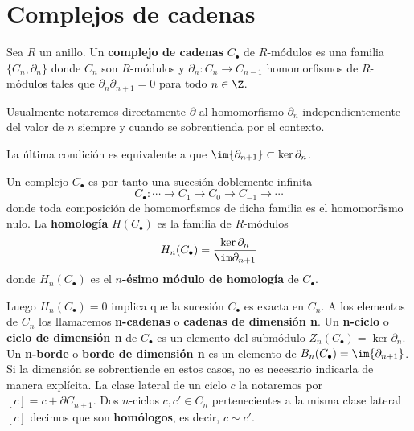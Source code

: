 \section{Complejos de cadenas}

\begin{definicion}
	Sea \(R\) un anillo. Un \textbf{complejo de cadenas} \(C_{\bullet}\) de \(R\)-módulos
	es una familia \(\{C_{n}, \partial_{n}\}\) donde \(C_{n}\) son \(R\)-módulos y \(\partial
	_{n} : C_{n} \rightarrow C_{n-1}\) homomorfismos de \(R\)-módulos tales que \(\partial
	_{n} \partial_{n+1}= 0\) para todo \(n \in \Z\).
\end{definicion}
\begin{nota}
	Usualmente notaremos directamente \(\partial\) al homomorfismo \(\partial_{n}\) independientemente
	del valor de \(n\) siempre y cuando se sobrentienda por el contexto.
\end{nota}
\begin{observacion}
	La última condición es equivalente a que \(\im{\partial_{n+1}}\subset \ker{\partial_n}\).
\end{observacion}
Un complejo \(C_{\bullet}\) es por tanto una sucesión doblemente infinita
\[
C_{\bullet}: \cdots \rightarrow C_{1}\rightarrow C_{0} \rightarrow C_{-1}\rightarrow
\cdots
\]
donde toda composición de homomorfismos de dicha familia es el homomorfismo nulo.
La \textbf{homología} \(H(C_{\bullet})\) es la familia de \(R\)-módulos
\[
H_{n}(C_{\bullet}) = \frac{\ker \partial_{n}}{\im \partial_{n+1}}
\]
donde \(H_{n}(C_{\bullet})\) es el \textbf{\(n\)-ésimo módulo de homología} de \(C_{\bullet}\).

Luego \(H_{n}(C_{\bullet})=0\) implica que la sucesión \(C_{\bullet}\) es exacta en \(C
_{n}\). A los elementos de \(C_{n}\) los llamaremos \textbf{n-cadenas} o \textbf{cadenas
	de dimensión n}. Un \textbf{n-ciclo} o \textbf{ciclo de dimensión n} de \(C_{\bullet}\)
es un elemento del submódulo \(Z_{n}(C_{\bullet}) = \ker \partial_{n}\). Un
\textbf{n-borde} o \textbf{borde de dimensión n} es un elemento de
\(B_{n}(C_{\bullet})= \im{\partial_{n+1}}\). Si la dimensión se sobrentiende en estos
casos, no es necesario indicarla de manera explícita. La clase lateral de un ciclo
\(c\) la notaremos por \([c] = c + \partial C_{n+1}\). Dos \(n\)-ciclos
\(c,c' \in C_{n}\) pertenecientes a la misma clase lateral \([c]\) decimos que son
\textbf{homólogos}, es decir, \(c \sim c'\).

